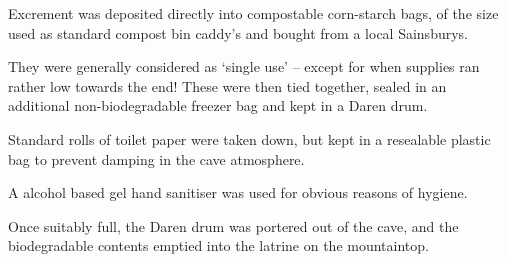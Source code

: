 Excrement was deposited directly into compostable corn-starch bags, of the size used as standard compost bin caddy's and bought from a local Sainsburys.

They were generally considered as `single use' -- except for when supplies ran rather low towards the end! These were then tied together, sealed in an additional non-biodegradable freezer bag and kept in a Daren drum.

Standard rolls of toilet paper were taken down, but kept in a resealable plastic bag to prevent damping in the cave atmosphere.

A alcohol based gel hand sanitiser was used for obvious reasons of hygiene.

Once suitably full, the Daren drum was portered out of the cave, and the biodegradable contents emptied into the latrine on the mountaintop.

